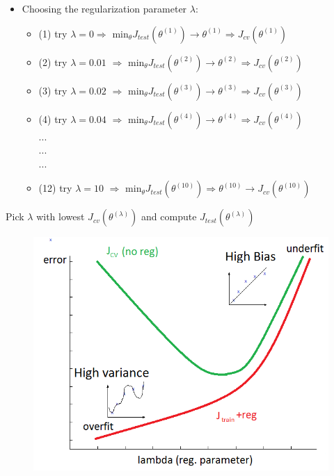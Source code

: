 \documentclass[a4paper,12pt]{report}
\begin{document}
\begin{itemize}
\item Choosing the regularization parameter $\lambda$:
\begin{itemize}
\item (1) try $\lambda=0 \Rightarrow$ ${\mathrm{min}}_{\theta} J_{test}(\theta^{(1)}) \rightarrow \theta^{(1)} \Rightarrow J_{cv}(\theta^{(1)})$
\item (2) try $\lambda=0.01$ $\Rightarrow$ ${\mathrm{min}}_{\theta} J_{test}(\theta^{(2)}) \rightarrow \theta^{(2)} \Rightarrow J_{cv}(\theta^{(2)})$
\item (3) try $\lambda=0.02$ $\Rightarrow$ ${\mathrm{min}}_{\theta} J_{test}(\theta^{(3)}) \rightarrow \theta^{(3)} \Rightarrow J_{cv}(\theta^{(3)})$
\item (4) try $\lambda=0.04$ $\Rightarrow$ ${\mathrm{min}}_{\theta} J_{test}(\theta^{(4)}) \rightarrow \theta^{(4)} \Rightarrow J_{cv}(\theta^{(4)})$ \\
...\\
...\\
...\\
\item (12) try $\lambda=10$ $\Rightarrow$ ${\mathrm{min}}_{\theta} J_{test}(\theta^{(10)}) \Rightarrow \theta^{(10)} \rightarrow J_{cv}(\theta^{(10)})$
\end{itemize}
\end{itemize}
Pick $\lambda$ with lowest $J_{cv}(\theta^{(\lambda)})$ and compute $J_{test}(\theta^{(\lambda)})$
\begin{figure}[H]
	\centering
        \includegraphics[totalheight=5 cm]{regularization.png}
\end{figure}
\end{document}

